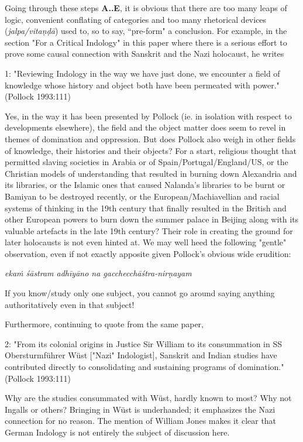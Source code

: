 {\begin{enumerate}
Going through these steps {\bf A..E}, it is obvious that there are too many leaps of logic, convenient conflating of categories and too many rhetorical devices ({\sl jalpa/vitaṇḍā}) used to, so to say, “pre-form" a conclusion. For example, in the section "For a Critical Indology" in this paper where there is a serious effort to prove some causal connection with Sanskrit and the Nazi holocaust, he writes
\begin{myquote}
1: "Reviewing Indology in the way we have just done, we encounter a field of knowledge whose history and object 
both have been permeated with power."\hfill (Pollock 1993:111)
\end{myquote}

Yes, in the way it has been presented by Pollock (ie. in isolation with respect to developments elsewhere), the field and the object matter does seem to revel in themes of domination and oppression. But does Pollock also weigh in other fields of knowledge, their histories and their objects? For a start, religious thought that permitted slaving societies in Arabia or of Spain/Portugal/England/US, or the Christian models of understanding that resulted in burning down Alexandria and its libraries, or the Islamic ones that caused Nalanda's libraries to be burnt or Bamiyan to be destroyed recently, or the European/Machiavellian and racial systems of thinking in the 19th century that finally resulted in the British and other European powers to burn down the summer palace in Beijing along with its valuable artefacts in the late 19th century?  Their role in creating the ground for later holocausts is not even hinted at. We may well heed the following "gentle" observation, even if not exactly apposite given Pollock’s obvious wide erudition:
\begin{myquote}
{\sl ekaṁ śāstram adhīyāno na gacchecchāśtra-nirṇayam}
\end{myquote}
If you know/study only one subject, you cannot go around saying anything authoritatively even in that subject!

Furthermore, continuing to quote from the same paper,
\begin{myquote}
2: "From its colonial origins in Justice Sir William to its consummation in SS Obersturmführer Wüst ["Nazi" Indologist], Sanskrit and Indian studies have contributed directly to consolidating and sustaining programs of domination."	\hfill(Pollock 1993:111)
\end{myquote}

Why are the studies consummated with Wüst, hardly known to most?  Why not Ingalls or others? Bringing in Wüst is underhanded; it emphasizes the Nazi connection for no reason. The mention of William Jones makes it clear that German Indology is not entirely the subject of discussion here.


\end{enumerate}}
